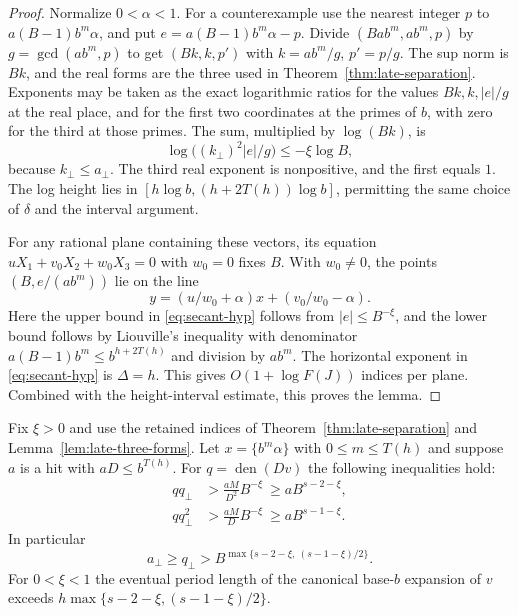 \begin{proof}
Normalize \(0<\alpha<1\). For a counterexample use the nearest
integer \(p\) to \(a(B-1)b^m\alpha\), and put
\(e=a(B-1)b^m\alpha-p\). Divide
\((Ba b^m,a b^m,p)\) by \(g=\gcd(a b^m,p)\) to get
\((B k,k,p')\) with \(k=a b^m/g\), \(p'=p/g\).
The sup norm is \(B k\), and the real forms are the three
used in Theorem~\ref{thm:late-separation}. Exponents may be
taken as the exact logarithmic ratios for the values \(Bk,k,|e|/g\)
at the real place, and for the first two coordinates at the primes
of \(b\), with zero for the third at those primes.
The sum, multiplied by \(\log(Bk)\), is
\[
 \log\bigl((k_\perp)^2 |e|/g\bigr)
     \le -\xi\log B,
\]
because \(k_\perp\le a_\perp\). The third real exponent is
nonpositive, and the first equals \(1\). The log height lies in
\([h\log b,(h+2T(h))\log b]\), permitting the same choice of
\(\delta\) and the interval argument.

For any rational plane containing these vectors, its equation
\(uX_1+v_0X_2+w_0X_3=0\) with \(w_0=0\) fixes \(B\).
With \(w_0\ne0\), the points
\((B,e/(a b^m))\) lie on the line
\[
 y=(u/w_0+\alpha)x+(v_0/w_0-\alpha).
\]
Here the upper bound in \eqref{eq:secant-hyp} follows from
\(|e|\le B^{-\xi}\), and the lower bound follows by Liouville's
inequality with denominator \(a(B-1)b^m\le b^{h+2T(h)}\)
and division by \(a b^m\). The horizontal exponent in
\eqref{eq:secant-hyp} is \(\Delta=h\). This gives
\(O(1+\log F(J))\) indices per plane. Combined with the
height-interval estimate, this proves the lemma.
\end{proof}

\begin{theorem}\label{thm:reduced-cost}
Fix \(\xi>0\) and use the retained indices of
Theorem~\ref{thm:late-separation} and Lemma~\ref{lem:late-three-forms}.
Let \(x=\{b^m\alpha\}\) with \(0\le m\le T(h)\) and suppose
\(a\) is a hit with \(aD\le b^{T(h)}\).
For \(q=\operatorname{den}(Dv)\) the following inequalities hold:
\begin{equation}\label{eq:reduced-cost}
 \begin{aligned}
 q q_\perp &> \frac{a M}{D^2} B^{-\xi}
                      \ \ge a B^{s-2-\xi},\\
 q q_\perp^2 &> \frac{a M}{D} B^{-\xi}
                      \ \ge a B^{s-1-\xi}.
 \end{aligned}
\end{equation}
In particular
\begin{equation}\label{eq:qperp}
 a_\perp\ge q_\perp>
      B^{\max\{s-2-\xi,\ (s-1-\xi)/2\}} .
\end{equation}
For \(0<\xi<1\) the eventual period length of the canonical
base-\(b\) expansion of \(v\) exceeds
\(h\max\{s-2-\xi,(s-1-\xi)/2\}\).
\end{theorem}

